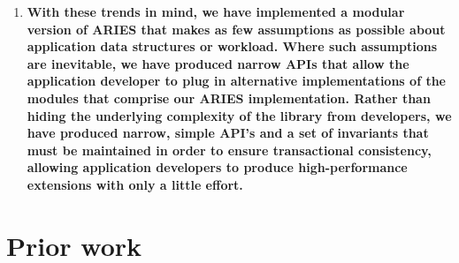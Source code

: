 \documentclass[letterpaper,twocolumn,english]{article}
\begin{document}
\begin{enumerate}
  \item {\bf With these trends in mind, we have implemented a modular
  version of ARIES that makes as few assumptions as possible about
  application data structures or workload. Where such assumptions are
  inevitable, we have produced narrow APIs that allow the application
  developer to plug in alternative implementations of the modules that
  comprise our ARIES implementation. Rather than hiding the underlying
  complexity of the library from developers, we have produced narrow,
  simple API's and a set of invariants that must be maintained in
  order to ensure transactional consistency, allowing application
  developers to produce high-performance extensions with only a little
  effort.}

\end{enumerate}
\section{Prior work}
\end{document}
